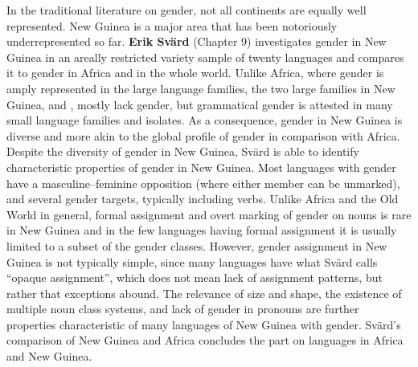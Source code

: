 \documentclass[output=collectionpaper]{langsci/langscibook}
\begin{document}
In the traditional literature on gender, not all continents are equally well represented. New Guinea is a major area that has been notoriously underrepresented so far. \textbf{Erik Svärd} (Chapter 9) investigates gender in New Guinea in an areally restricted variety sample of twenty languages and compares it to gender in Africa and in the whole world. Unlike Africa, where gender is amply represented in the large language families, the two large families in New Guinea,  and , mostly lack gender, but grammatical gender is attested in many small language families and isolates. As a consequence, gender in New Guinea is diverse and more akin to the global profile of gender in comparison with Africa. Despite the diversity of gender in New Guinea, Svärd is able to identify characteristic properties of gender in New Guinea. Most languages with gender have a masculine–feminine opposition (where either member can be unmarked), and several gender targets, typically including verbs. Unlike Africa and the Old World in general, formal assignment and overt marking of gender on nouns is rare in New Guinea and in the few languages having formal assignment it is usually limited to a subset of the gender classes. However, gender assignment in New Guinea is not typically simple, since many languages have what Svärd calls ``opaque assignment'', which does not mean lack of assignment patterns, but rather that exceptions abound. The relevance of size and shape, the existence of multiple noun class systems, and lack of gender in pronouns are further properties characteristic of many languages of New Guinea with gender. Svärd’s comparison of New Guinea and Africa concludes the part on languages in Africa and New Guinea.
\end{document}
